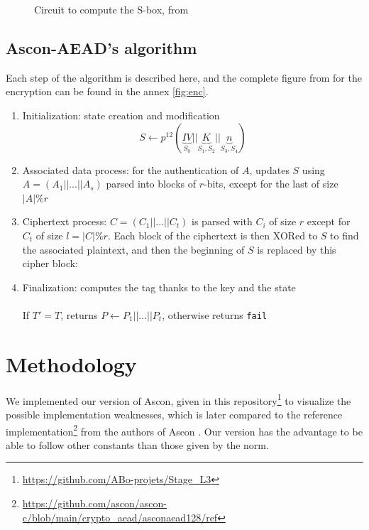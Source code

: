 \documentclass[11pt,technote]{IEEEtran}
\begin{document}
		\begin{figure}[H]
			\centering
			\resizebox*{230pt}{135pt}{
			
			}
			\caption{Circuit to compute the S-box, from \protect \footnotemark}
			\label{circuit_sbox}
		\end{figure}
		
		
		
		\subsection{Ascon-AEAD's algorithm}
		Each step of the algorithm is described here, and the complete figure from \cite{cours_crypto} for the encryption can be found in the annex \ref{fig:enc}.
		
		\begin{enumerate}
		\item Initialization: state creation and modification
		$$S \leftarrow p^{12}( \underbrace{IV}_{S_0}||\underbrace{K}_{S_1,S_2}||\underbrace{n}_{S_3,S_4})$$
		
		\item Associated data process: for the authentication of $A$, updates $S$ using $A=(A_1||...||A_s)$ parsed into blocks of $r$-bits, except for the last of size $|A|\%r$\\
		
		\item Ciphertext process: $C = (C_1 || ... || C_t)$ is parsed with $C_i$ of size $r$ except for $C_t$ of size $l=|C| \% r$. Each block of the ciphertext is then XORed to $S$ to find the associated plaintext, and then the beginning of $S$ is replaced by this cipher block:\\
		
		\item Finalization: computes the tag thanks to the key and the state\\
		\\
		If $T'= T$, returns $P \leftarrow P_1 || ... || P_t$, otherwise returns \verb|fail|
		\end{enumerate}
		
		\section{Methodology}
		We implemented our version of Ascon, given in this repository\footnote{\url{https://github.com/ABo-projets/Stage_L3}} to visualize the possible implementation weaknesses, which is later compared to the reference implementation\footnote{\url{https://github.com/ascon/ascon-c/blob/main/crypto\_aead/asconaead128/ref}} from the authors of Ascon \cite{ascon}. Our version has the advantage to be able to follow other constants than those given by the norm.
		
\end{document}

